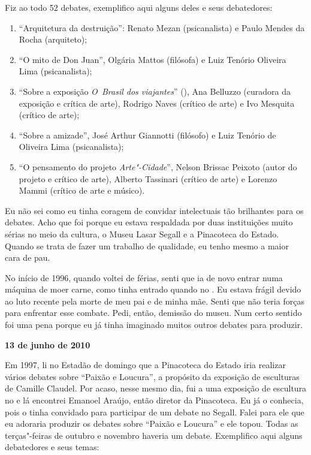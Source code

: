 Fiz ao todo 52 debates, exemplifico aqui alguns deles e seus
debatedores:

\begin{enumerate}
\item
  ``Arquitetura da destruição'': Renato Mezan (psicanalista) e Paulo
  Mendes da Rocha (arquiteto);
\item
  ``O mito de Don Juan'', Olgária Mattos (filósofa) e Luiz Tenório
  Oliveira Lima (psicanalista);
\item
  ``Sobre a exposição \emph{O~Brasil dos viajantes}'' (), Ana
  Belluzzo (curadora da exposição e crítica de arte), Rodrigo Naves
  (crítico de arte) e Ivo Mesquita (crítico de arte);
\item
  ``Sobre a amizade'', José Arthur Giannotti (filósofo) e Luiz Tenório
  de Oliveira Lima (psicanalista);
\item
  ``O pensamento do projeto \emph{Arte"-Cidade}'', Nelson Brissac Peixoto
  (autor do projeto e crítico de arte), Alberto Tassinari (crítico de
  arte) e Lorenzo Mammi (crítico de arte e músico).
\end{enumerate}
Eu não sei como eu tinha coragem de convidar intelectuais tão brilhantes
para os debates. Acho que foi porque eu estava respaldada por duas
instituições muito sérias no meio da cultura, o Museu Lasar Segall e a
Pinacoteca do Estado. Quando se trata de fazer um trabalho de qualidade,
eu tenho mesmo a maior cara de pau.

No início de 1996, quando voltei de férias, senti que ia de novo entrar
numa máquina de moer carne, como tinha entrado quando no . Eu estava
frágil devido ao luto recente pela morte de meu pai e de minha mãe.
Senti que não teria forças para enfrentar esse combate. Pedi, então,
demissão do museu. Num certo sentido foi uma pena porque eu já tinha
imaginado muitos outros debates para produzir.

\begin{center}\asterisc{}\end{center}


\begin{flushright}\textbf{13 de junho de 2010}\end{flushright}


Em 1997, li no Estadão de domingo que a Pinacoteca do Estado iria
realizar vários debates sobre ``Paixão e Loucura'', a propósito da
exposição de esculturas de Camille Claudel. Por acaso, nesse mesmo dia,
fui a uma exposição de escultura no  e lá encontrei Emanoel Araújo,
então diretor da Pinacoteca. Eu já o conhecia, pois o tinha convidado
para participar de um debate no Segall. Falei para ele que eu adoraria
produzir os debates sobre ``Paixão e Loucura'' e ele topou. Todas as
terças"-feiras de outubro e novembro haveria um debate. Exemplifico aqui
alguns debatedores e seus temas:

